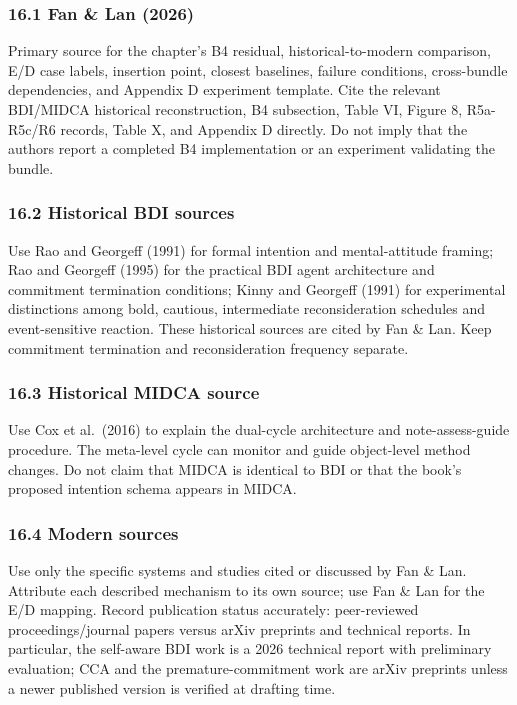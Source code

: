 \subsubsection{16.1 Fan \& Lan (2026)}\label{fan-lan-2026}

Primary source for the chapter's B4 residual, historical-to-modern comparison, E/D case labels, insertion point, closest baselines, failure conditions, cross-bundle dependencies, and Appendix D experiment template. Cite the relevant BDI/MIDCA historical reconstruction, B4 subsection, Table VI, Figure 8, R5a-R5c/R6 records, Table X, and Appendix D directly. Do not imply that the authors report a completed B4 implementation or an experiment validating the bundle.

\subsubsection{16.2 Historical BDI sources}\label{historical-bdi-sources}

Use Rao and Georgeff (1991) for formal intention and mental-attitude framing; Rao and Georgeff (1995) for the practical BDI agent architecture and commitment termination conditions; Kinny and Georgeff (1991) for experimental distinctions among bold, cautious, intermediate reconsideration schedules and event-sensitive reaction. These historical sources are cited by Fan \& Lan. Keep commitment termination and reconsideration frequency separate.

\subsubsection{16.3 Historical MIDCA source}\label{historical-midca-source}

Use Cox et al.~(2016) to explain the dual-cycle architecture and note-assess-guide procedure. The meta-level cycle can monitor and guide object-level method changes. Do not claim that MIDCA is identical to BDI or that the book's proposed intention schema appears in MIDCA.

\subsubsection{16.4 Modern sources}\label{modern-sources}

Use only the specific systems and studies cited or discussed by Fan \& Lan. Attribute each described mechanism to its own source; use Fan \& Lan for the E/D mapping. Record publication status accurately: peer-reviewed proceedings/journal papers versus arXiv preprints and technical reports. In particular, the self-aware BDI work is a 2026 technical report with preliminary evaluation; CCA and the premature-commitment work are arXiv preprints unless a newer published version is verified at drafting time.

